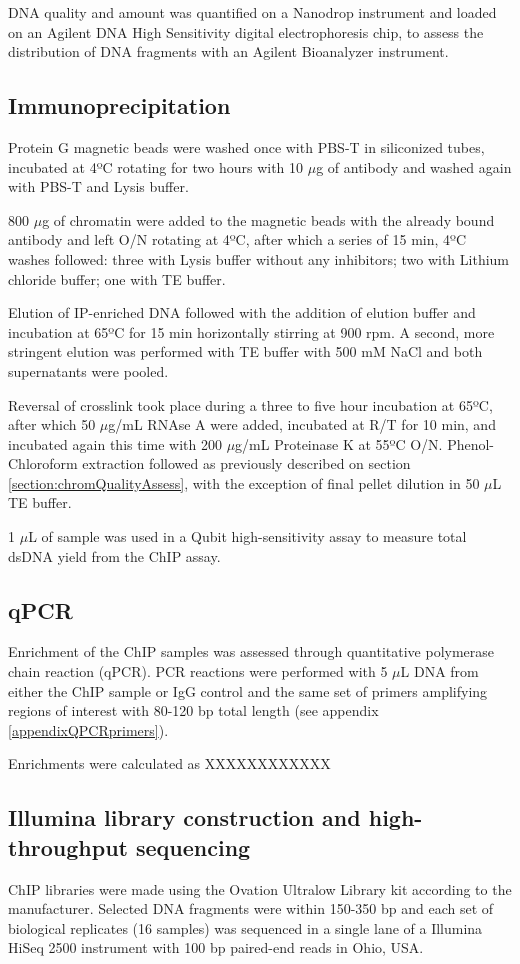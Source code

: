 \documentclass[11pt,twoside,a4paper]{report}
\begin{document}
			DNA quality and amount was quantified on a Nanodrop instrument and loaded on an Agilent DNA High Sensitivity digital electrophoresis chip, to assess the distribution of DNA fragments with an Agilent Bioanalyzer instrument.
			
			\subsection{Immunoprecipitation}
			Protein G magnetic beads were washed once with PBS-T in siliconized tubes, incubated at 4ºC rotating for two hours with 10 $\mu$g of antibody and washed again with PBS-T and Lysis buffer.
			
			800 $\mu$g of chromatin were added to the magnetic beads with the already bound antibody and left O/N rotating at 4ºC, after which a series of 15 min, 4ºC washes followed: three with Lysis buffer without any inhibitors; two with Lithium chloride buffer; one with TE buffer.
			
			Elution of IP-enriched DNA followed with the addition of elution buffer and incubation at 65ºC for 15 min horizontally stirring at 900 rpm. A second, more stringent elution was performed with TE buffer with 500 mM NaCl and both supernatants were pooled.
			
			Reversal of crosslink took place during a three to five hour incubation at 65ºC, after which 50 $\mu$g/mL RNAse A were added, incubated at R/T for 10 min, and incubated again this time with 200 $\mu$g/mL Proteinase K at 55ºC O/N. Phenol-Chloroform extraction followed as previously described on section \ref{section:chromQualityAssess}, with the exception of final pellet dilution in 50 $\mu$L TE buffer.
			
			1 $\mu$L of sample was used in a Qubit high-sensitivity assay to measure total dsDNA yield from the ChIP assay.
			
			\subsection{qPCR}
			Enrichment of the ChIP samples was assessed through quantitative polymerase chain reaction (qPCR). PCR reactions were performed with 5 $\mu$L DNA from  either the ChIP sample or IgG control and the same set of primers amplifying regions of interest with 80-120 bp total length (see appendix \ref{appendixQPCRprimers}).
			
			Enrichments were calculated as XXXXXXXXXXXX
		
			\subsection{Illumina library construction and high-throughput sequencing}
			ChIP libraries were made using the Ovation Ultralow Library kit according to the manufacturer. Selected DNA fragments were within 150-350 bp and each set of biological replicates (16 samples) was sequenced in a single lane of a Illumina HiSeq 2500 instrument with 100 bp paired-end reads in Ohio, USA.
		
\end{document}
